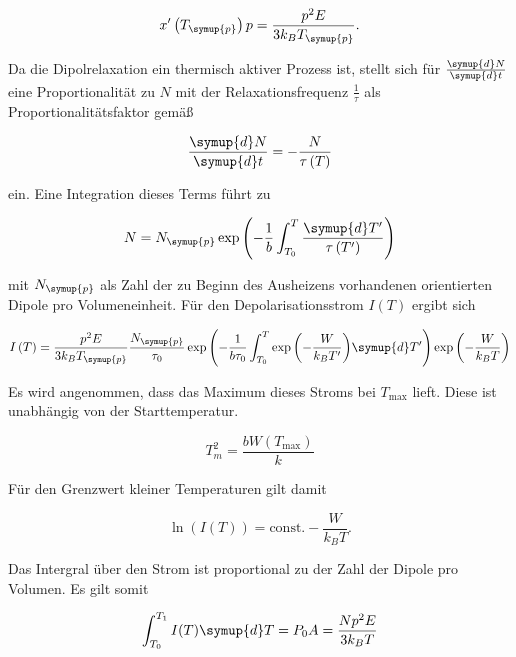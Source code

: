 \begin{equation*}
    x'\left(T_{\symup{p}}\right)p = \frac{p^2 E}{3k_B T_{\symup{p}}}.
\end{equation*}

Da die Dipolrelaxation ein thermisch aktiver Prozess ist, stellt sich für $\frac{\symup{d}N}{\symup{d}t}$ eine Proportionalität zu $N$ mit der Relaxationsfrequenz 
$\frac{1}{\tau}$ als Proportionalitätsfaktor gemäß 

\begin{equation*}
    \frac{\symup{d}N}{\symup{d}t} = -\frac{N}{\tau\left(T\right)}
\end{equation*}

ein. Eine Integration dieses Terms führt zu 

\begin{equation*}
    N = N_{\symup{p}}\exp{\left(-\frac{1}{b}\int_{T_0}^{T}\frac{\symup{d}T'}{\tau\left(T'\right)}\right)}
\end{equation*}

mit $N_{\symup{p}}$ als Zahl der zu Beginn des Ausheizens vorhandenen orientierten Dipole pro Volumeneinheit. Für den Depolarisationsstrom $I(T)$ ergibt sich

\begin{equation*}
    I\left(T\right) = \frac{p^2E}{3k_B T_{\symup{p}}}\frac{N_{\symup{p}}}{\tau_0} \exp{\left(-\frac{1}{b\tau_0}\int_{T_0}^{T}\exp{\left(-\frac{W}{k_B T'}\right)}\symup{d}T'\right)}\exp{\left(-\frac{W}{k_B T}\right)}
\end{equation*}

Es wird angenommen, dass das Maximum dieses Stroms bei $T_{\text{max}}$ lieft. Diese ist unabhängig von der Starttemperatur.

\begin{equation*}
    T_m^2 = \frac{bW\left(T_{\text{max}}\right)}{k}
\end{equation*}

Für den Grenzwert kleiner Temperaturen gilt damit 

\begin{equation*}
    \ln{\left(I\left(T\right)\right)} = \text{const.}-\frac{W}{k_B T }.
\end{equation*}

Das Intergral über den Strom ist proportional zu der Zahl der Dipole pro Volumen. Es gilt somit 

\begin{equation*}
    \int_{T_0}^{T_1} I(T)\symup{d}T = P_0 A = \frac{Np^2E}{3k_B T}
\end{equation*}

